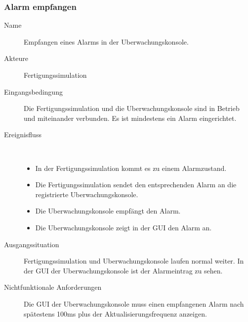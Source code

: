 \documentclass[parskip=full]{scrartcl}
\begin{document}
\subsubsection{Alarm empfangen}
\begin{description}
 \item[Name] Empfangen eines Alarms in der \gls{Uberwachungskonsole}.
 \item[Akteure] \gls{Fertigungssimulation}
 \item[Eingangsbedingung] Die \gls{Fertigungssimulation} und die \gls{Uberwachungskonsole} sind in Betrieb und miteinander verbunden.
  Es ist mindestens ein Alarm eingerichtet.
 \item[Ereignisfluss]~\\
 \begin{itemize}[noitemsep]
  \item In der \gls{Fertigungssimulation} kommt es zu einem Alarmzustand.
  \item Die \gls{Fertigungssimulation} sendet den entsprechenden Alarm an die registrierte \gls{Uberwachungskonsole}.
  \item Die \gls{Uberwachungskonsole} empf\"angt den Alarm.
  \item Die \gls{Uberwachungskonsole} zeigt in der \gls{GUI} den Alarm an.
 \end{itemize}
 \item[Ausgangssituation] \gls{Fertigungssimulation} und \gls{Uberwachungskonsole} laufen normal weiter. In der \gls{GUI} der
  \gls{Uberwachungskonsole} ist der Alarmeintrag zu sehen.
 \item [Nichtfunktionale Anforderungen] Die \gls{GUI} der \gls{Uberwachungskonsole} muss einen empfangenen Alarm nach sp\"atestens
  100ms plus der Aktualisierungsfrequenz anzeigen.
\end{description}
\end{document}
